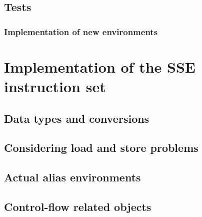     \section{Tests} 

    \subsection{Implementation of new environments} 

\chapter{Implementation of the SSE instruction set}
    \label{ch:sse}

    \section{Data types and conversions}

    \section{Considering load and store problems} 

    \section{Actual alias environments} 
      

    \section{Control-flow related objects} 


%
%

